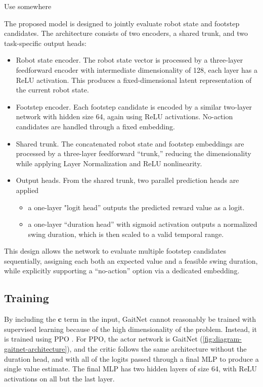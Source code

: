 \begin{todo}
  Use \cite{feng2021deep} somewhere
\end{todo}

The proposed model is designed to jointly evaluate robot state and
footstep candidates. The architecture consists of two
encoders, a shared trunk, and two task-specific output heads:

\begin{itemize}
  \item Robot state encoder. The robot state vector is processed by a
    three-layer feedforward encoder with intermediate dimensionality
    of 128, each layer has a ReLU activation.
    This produces a fixed-dimensional latent representation of the
    current robot state.
  \item Footstep encoder. Each footstep candidate is encoded by a similar
    two-layer network with hidden size 64, again using ReLU activations.
    No-action candidates are handled through a fixed embedding.
  \item Shared trunk. The concatenated robot state and footstep embeddings
    are processed by a three-layer feedforward “trunk,” reducing the
    dimensionality while applying Layer Normalization and ReLU nonlinearity.
  \item Output heads. From the shared trunk, two parallel prediction heads
    are applied

    \begin{itemize}
      \item a one-layer "logit head” outputs the predicted reward
        value as a logit.
      \item a one-layer “duration head” with sigmoid activation
        outputs a normalized swing duration, which is then scaled to a
        valid temporal range.
    \end{itemize}
\end{itemize}

This design allows the network to evaluate multiple footstep
candidates sequentially, assigning each both an expected value
and a feasible swing duration, while explicitly supporting a
“no-action” option via a dedicated embedding.

\subsection{Training}

By including the $\mathbf c$ term in the input, GaitNet cannot reasonably
be trained with supervised learning because of the high
dimensionality of the problem. Instead, it is trained
using PPO \cite{todo}. For PPO, the actor network is GaitNet
(\autoref{fig:diagram-gaitnet-architecture}),
and the critic follows the same architecture without the duration head,
and with all of the logits passed through a final MLP to produce a single
value estimate. The final MLP has two hidden layers of size 64, with
ReLU activations on all but the last layer.


